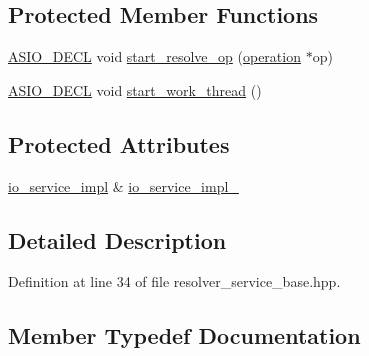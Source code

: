 \subsection*{Protected Member Functions}
\begin{DoxyCompactItemize}
\item 
\hyperlink{config_8hpp_ab54d01ea04afeb9a8b39cfac467656b7}{A\+S\+I\+O\+\_\+\+D\+E\+C\+L} void \hyperlink{classasio_1_1detail_1_1resolver__service__base_ab8101d8c9185385f63d5a9322f9fdb9a}{start\+\_\+resolve\+\_\+op} (\hyperlink{namespaceasio_1_1detail_a338968609bec20e37145309f8f9ec936}{operation} $\ast$op)
\item 
\hyperlink{config_8hpp_ab54d01ea04afeb9a8b39cfac467656b7}{A\+S\+I\+O\+\_\+\+D\+E\+C\+L} void \hyperlink{classasio_1_1detail_1_1resolver__service__base_ab0949651534e4c18edebfbfeae93df8d}{start\+\_\+work\+\_\+thread} ()
\end{DoxyCompactItemize}
\subsection*{Protected Attributes}
\begin{DoxyCompactItemize}
\item 
\hyperlink{namespaceasio_1_1detail_a6d61d9b8e53c11288be549d82aec5a42}{io\+\_\+service\+\_\+impl} \& \hyperlink{classasio_1_1detail_1_1resolver__service__base_ae43e2e86bff8660b2a9cd3736002365e}{io\+\_\+service\+\_\+impl\+\_\+}
\end{DoxyCompactItemize}


\subsection{Detailed Description}


Definition at line 34 of file resolver\+\_\+service\+\_\+base.\+hpp.



\subsection{Member Typedef Documentation}
\hypertarget{classasio_1_1detail_1_1resolver__service__base_ab07ff8adc9e2f3d5841021e99e190c16}{}
